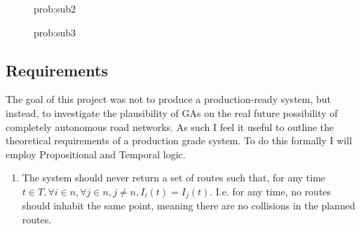 \begin{figure}[htpb]
    \centering
    \begin{problem}{prob:sub2}
    \end{problem}
\end{figure} 

\begin{figure}[htpb]
    \centering
    \begin{problem}{prob:sub3}
    \end{problem}
  \end{figure}

\subsection{Requirements}
\label{subsec:requirements}

The goal of this project was not to produce a production-ready system, but instead, to investigate the plausibility of GAs on the real future possibility of completely autonomous road networks. As such I feel it useful to outline the theoretical requirements of a production grade system. To do this formally I will employ Propositional and Temporal logic.

\begin{enumerate}
\item The system should never return a set of routes such that, for any time $t \in T, \forall i \in n, \forall j \in n, j \neq n, I_{i}(t) = I_{j}(t)$. I.e. for any time, no routes should inhabit the same point, meaning there are no collisions in the planned routes.
\end{enumerate}


